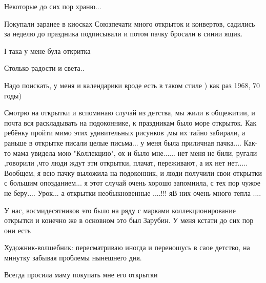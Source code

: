 Некоторые до сих пор храню...


Покупали заранее в киосках Союзпечати много открыток и конвертов, садились за
неделю до праздника подписывали и потом пачку бросали в синии ящик.

І така у мене була откритка

Столько радости и света..

Надо поискать, у меня и календарики вроде есть в таком стиле ) как раз 1968, 70 годы)


Смотрю на открытки и вспоминаю случай из детства, мы жили в общежитии, и почта
вся раскладывать на подоконнике, к праздникам было море открыток. Как ребёнку
пройти мимо этих удивительных рисунков ,мы их тайно забирали, а раньше в
открытке писали целые письма... у меня была приличная пачка.... Как-то мама
увидела мою "Коллекцию", ох и было мне...... нет меня не били, ругали ,говорили
,что люди ждут эти открытки, плачат, переживают, а их нет нет..... Вообщем, я всю
пачку выложила на подоконник, и люди получили свои открытки с большим
опозданием... я этот случай очень хорошо запомнила, с тех пор чужое не
беру.... Урок... а открытки необыкновенные ....!!! яВ них очень много тепла ....


У нас, восмидесятников это было на ряду с марками коллекционирование открытки и конечно же в основном это был Зарубин. У меня кстати до сих пор они есть

Художник-волшебник: пересматриваю иногда и переношусь в саое детство, на минутку забывая проблемы нынешнего дня.

Всегда просила маму покупать мне его открытки
